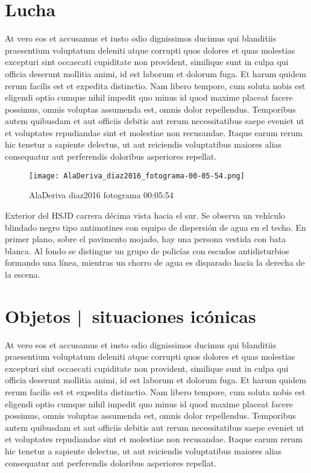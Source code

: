 \clearpage
\section{Lucha}

At vero eos et accusamus et iusto odio dignissimos ducimus qui blanditiis praesentium voluptatum deleniti atque corrupti quos dolores et quas molestias excepturi sint occaecati cupiditate non provident, similique sunt in culpa qui officia deserunt mollitia animi, id est laborum et dolorum fuga. Et harum quidem rerum facilis est et expedita distinctio. Nam libero tempore, cum soluta nobis est eligendi optio cumque nihil impedit quo minus id quod maxime placeat facere possimus, omnis voluptas assumenda est, omnis dolor repellendus. Temporibus autem quibusdam et aut officiis debitis aut rerum necessitatibus saepe eveniet ut et voluptates repudiandae sint et molestiae non recusandae. Itaque earum rerum hic tenetur a sapiente delectus, ut aut reiciendis voluptatibus maiores alias consequatur aut perferendis doloribus asperiores repellat.

\clearpage
\begin{figure}[h!]
    \centering
    \texttt{[image: AlaDeriva\_diaz2016\_fotograma-00-05-54.png]}
    \caption{AlaDeriva diaz2016 fotograma 00:05:54}
    \label{fig:AlaDeriva_diaz2016_fotograma_00_05_54}
\end{figure}

Exterior del HSJD carrera décima vista hacia el sur. Se observa un vehículo blindado negro tipo antimotines con equipo de dispersión de agua en el techo. En primer plano, sobre el pavimento mojado, hay una persona vestida con bata blanca. Al fondo se distingue un grupo de policías con escudos antidisturbios formando una línea, mientras un chorro de agua es disparado hacia la derecha de la escena. \parencite[fotograma: 00:05:54]{AlaDeriva_diaz2016}


\clearpage
\section{Objetos | situaciones icónicas}

At vero eos et accusamus et iusto odio dignissimos ducimus qui blanditiis praesentium voluptatum deleniti atque corrupti quos dolores et quas molestias excepturi sint occaecati cupiditate non provident, similique sunt in culpa qui officia deserunt mollitia animi, id est laborum et dolorum fuga. Et harum quidem rerum facilis est et expedita distinctio. Nam libero tempore, cum soluta nobis est eligendi optio cumque nihil impedit quo minus id quod maxime placeat facere possimus, omnis voluptas assumenda est, omnis dolor repellendus. Temporibus autem quibusdam et aut officiis debitis aut rerum necessitatibus saepe eveniet ut et voluptates repudiandae sint et molestiae non recusandae. Itaque earum rerum hic tenetur a sapiente delectus, ut aut reiciendis voluptatibus maiores alias consequatur aut perferendis doloribus asperiores repellat.

